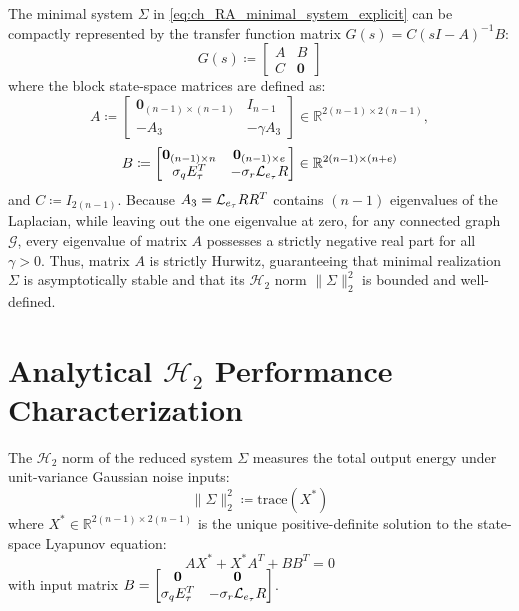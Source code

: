 The minimal system $\Sigma$ in \eqref{eq:ch_RA_minimal_system_explicit} can be compactly represented by the transfer function matrix $G(s) = C (sI - A)^{-1} B$:
\begin{equation}\label{sigma_system}
	G(s) \coloneqq \left[ \begin{array}{c|c} A & B \\ \hline C & \mathbf{0} \end{array} \right]
\end{equation}
where the block state-space matrices are defined as:
\begin{equation}\label{eq:ch_RA_system_matrices_A}
	A \coloneqq \begin{bmatrix} \mathbf{0}_{(n-1) \times (n-1)} & I_{n-1} \\ 
    -A_3 & -\gamma A_3 \end{bmatrix} \in \mathbb{R}^{2(n-1) \times 2(n-1)},
\end{equation}
\begin{equation}\label{eq:ch_RA_system_matrices_B}
	B \coloneqq \begin{bmatrix} \mathbf{0}_{(n-1) \times n} & \mathbf{0}_{(n-1) \times e} \\ \sigma_q E_\tau^T & -\sigma_r \mathcal{L}_{e_{\tau}} R \end{bmatrix} \in \mathbb{R}^{2(n-1) \times (n+e)}
\end{equation}
and $C \coloneqq I_{2(n-1)}$. Because $A_3 = \mathcal{L}_{e_{\tau}} R R^T$ contains $(n-1)$ eigenvalues of the Laplacian, while leaving out the one eigenvalue at zero, for any connected graph $\mathcal{G}$, every eigenvalue of matrix $A$ possesses a strictly negative real part for all $\gamma > 0$. Thus, matrix $A$ is strictly Hurwitz, guaranteeing that minimal realization $\Sigma$ is asymptotically stable and that its $\mathcal{H}_2$ norm $\|\Sigma\|_2^2$ is bounded and well-defined.

\section{Analytical $\mathcal{H}_2$ Performance Characterization}\label{sec:ch_RA_MainResults}

The $\mathcal{H}_2$ norm of the reduced system $\Sigma$ measures the total output energy under unit-variance Gaussian noise inputs:
\begin{equation}\label{eq:ch_RA_H2_def}
	\|\Sigma\|_2^2 \coloneqq \text{trace}(X^*)
\end{equation}
where $X^* \in \mathbb{R}^{2(n-1) \times 2(n-1)}$ is the unique positive-definite solution to the state-space Lyapunov equation:
\begin{equation}\label{eq:ch_RA_lyapunov_eq}
	A X^* + X^* A^T + B B^T = 0
\end{equation}
with input matrix $B = \begin{bmatrix} \mathbf{0} & \mathbf{0} \\ \sigma_q E_\tau^T & -\sigma_r \mathcal{L}_{e_{\tau}} R \end{bmatrix}$.

